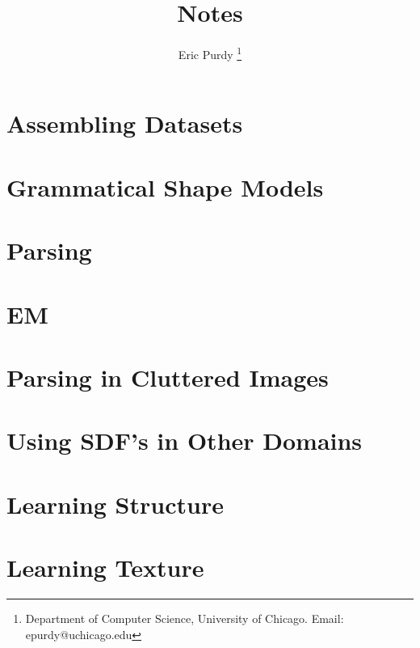 \documentclass{article}
\title{Notes}
\author{Eric Purdy \footnote{Department of Computer Science, University of Chicago. Email: epurdy@uchicago.edu}}
\begin{document}
\maketitle

\setcounter{section}{0}

\section{Assembling Datasets} 

\section{Grammatical Shape Models}


\section{Parsing}


\section{EM}


\section{Parsing in Cluttered Images}

\section{Using SDF's in Other Domains}

\section{Learning Structure}


\section{Learning Texture}

\end{document}
